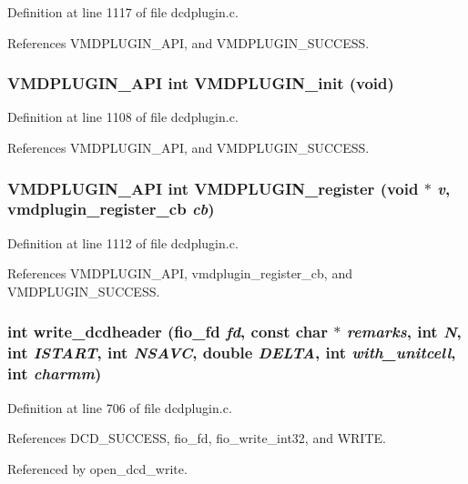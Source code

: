 Definition at line 1117 of file dcdplugin.c.

References VMDPLUGIN\_\-API, and VMDPLUGIN\_\-SUCCESS.
\subsubsection{\setlength{\rightskip}{0pt plus 5cm}VMDPLUGIN\_\-API int VMDPLUGIN\_\-init (void)}\label{dcdplugin_8c_a41}




Definition at line 1108 of file dcdplugin.c.

References VMDPLUGIN\_\-API, and VMDPLUGIN\_\-SUCCESS.
\subsubsection{\setlength{\rightskip}{0pt plus 5cm}VMDPLUGIN\_\-API int VMDPLUGIN\_\-register (void $\ast$ {\em v}, {\bf vmdplugin\_\-register\_\-cb} {\em cb})}\label{dcdplugin_8c_a42}




Definition at line 1112 of file dcdplugin.c.

References VMDPLUGIN\_\-API, vmdplugin\_\-register\_\-cb, and VMDPLUGIN\_\-SUCCESS.
\subsubsection{\setlength{\rightskip}{0pt plus 5cm}int write\_\-dcdheader ({\bf fio\_\-fd} {\em fd}, const char $\ast$ {\em remarks}, int {\em N}, int {\em ISTART}, int {\em NSAVC}, double {\em DELTA}, int {\em with\_\-unitcell}, int {\em charmm})\hspace{0.3cm}{\tt  [static]}}\label{dcdplugin_8c_a33}




Definition at line 706 of file dcdplugin.c.

References DCD\_\-SUCCESS, fio\_\-fd, fio\_\-write\_\-int32, and WRITE.

Referenced by open\_\-dcd\_\-write.
